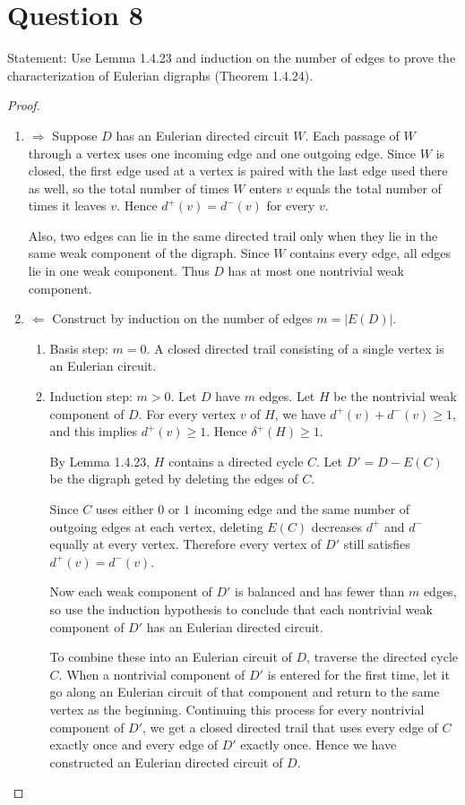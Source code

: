 \documentclass[11pt]{article}
\begin{document}
\section*{Question 8}
\noindent Statement: Use Lemma 1.4.23 and induction on the number of edges to prove the characterization of Eulerian digraphs (Theorem 1.4.24).
\begin{proof}
~
\begin{enumerate}
    \item $\Rightarrow$ Suppose $D$ has an Eulerian directed circuit $W$.
Each passage of $W$ through a vertex uses one incoming edge and one outgoing edge. Since $W$ is closed,
the first edge used at a vertex is paired with the last edge used there as well, so the total number of times
$W$ enters $v$ equals the total number of times it leaves $v$. Hence $d^+(v)=d^-(v)$ for every $v$.

Also, two edges can lie in the same directed trail only when they lie in the same weak component of the digraph. Since $W$ contains every edge, all edges lie in one
weak component. Thus $D$ has at most one nontrivial weak component.

\item $\Leftarrow$ Construct by induction on the number of edges $m=|E(D)|$.

\begin{enumerate}
    \item Basis step: $m=0$.
A closed directed trail consisting of a single vertex is an Eulerian circuit.

\item Induction step: $m>0$.
Let $D$ have $m$ edges. Let $H$ be the nontrivial weak component of $D$.
For every vertex $v$ of $H$, we have $d^+(v)+d^-(v)\ge 1$, and this implies $d^+(v)\ge 1$. Hence $\delta^+(H)\ge 1$.

By Lemma 1.4.23, $H$ contains a directed cycle $C$.
Let $D' = D - E(C)$ be the digraph geted by deleting the edges of $C$.

Since $C$ uses either $0$ or $1$ incoming edge and the same number of outgoing edges at each vertex,
deleting $E(C)$ decreases $d^+$ and $d^-$ equally at every vertex. Therefore every vertex of $D'$ still satisfies
$d^+(v)=d^-(v)$.

Now each weak component of $D'$ is balanced and has fewer than $m$ edges, so use the induction hypothesis
to conclude that each nontrivial weak component of $D'$ has an Eulerian directed circuit.

To combine these into an Eulerian circuit of $D$, traverse the directed cycle $C$. When a nontrivial component of
$D'$ is entered for the first time, let it go along an Eulerian circuit of that
component and return to the same vertex as the beginning. Continuing this process for every nontrivial component of
$D'$, we get a closed directed trail that uses every edge of $C$ exactly once
and every edge of $D'$ exactly once. Hence we have constructed an Eulerian directed circuit of $D$.
\end{enumerate}
\end{enumerate}
\end{proof}
\end{document}

